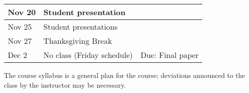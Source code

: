 \documentclass[12pt]{article}
\begin{document}
\begin{center}
\begin{tabular}[c]{lll}
Nov 20     & Student presentation                           &                                                       \\
\hline
Nov 25     & Student presentations                        &                                                       \\
Nov 27     & Thanksgiving Break                        &                                                       \\
\hline
Dec 2      & No class (Friday schedule)                   & Due: Final paper                                      \\
\hline \hline
\end{tabular}
\end{center}

The course syllabus is a general plan for the course; deviations announced to the class by the instructor may be necessary.
\end{document}
